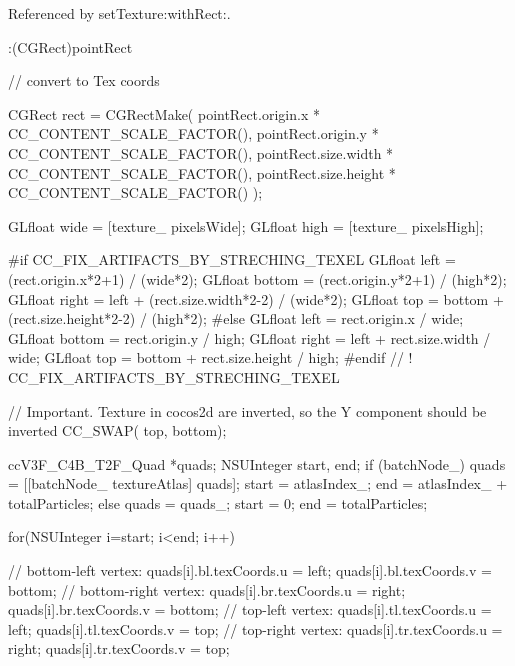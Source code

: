 Referenced by set\-Texture\-:with\-Rect\-:.


\begin{DoxyCode}
                             :(CGRect)pointRect
{
    // convert to Tex coords

        CGRect rect = CGRectMake(
                                                         pointRect.origin.x * 
      CC_CONTENT_SCALE_FACTOR(),
                                                         pointRect.origin.y * 
      CC_CONTENT_SCALE_FACTOR(),
                                                         pointRect.size.width *
       CC_CONTENT_SCALE_FACTOR(),
                                                         pointRect.size.height 
      * CC_CONTENT_SCALE_FACTOR() );

        GLfloat wide = [texture_ pixelsWide];
        GLfloat high = [texture_ pixelsHigh];

#if CC_FIX_ARTIFACTS_BY_STRECHING_TEXEL
        GLfloat left = (rect.origin.x*2+1) / (wide*2);
        GLfloat bottom = (rect.origin.y*2+1) / (high*2);
        GLfloat right = left + (rect.size.width*2-2) / (wide*2);
        GLfloat top = bottom + (rect.size.height*2-2) / (high*2);
#else
        GLfloat left = rect.origin.x / wide;
        GLfloat bottom = rect.origin.y / high;
        GLfloat right = left + rect.size.width / wide;
        GLfloat top = bottom + rect.size.height / high;
#endif // ! CC_FIX_ARTIFACTS_BY_STRECHING_TEXEL

        // Important. Texture in cocos2d are inverted, so the Y component
       should be inverted
        CC_SWAP( top, bottom);

        ccV3F_C4B_T2F_Quad *quads;
        NSUInteger start, end;
        if (batchNode_)
        {
                quads = [[batchNode_ textureAtlas] quads];
                start = atlasIndex_;
                end = atlasIndex_ + totalParticles;
        }
        else
        {
                quads = quads_;
                start = 0;
                end = totalParticles;
        }

        for(NSUInteger i=start; i<end; i++) {

                // bottom-left vertex:
                quads[i].bl.texCoords.u = left;
                quads[i].bl.texCoords.v = bottom;
                // bottom-right vertex:
                quads[i].br.texCoords.u = right;
                quads[i].br.texCoords.v = bottom;
                // top-left vertex:
                quads[i].tl.texCoords.u = left;
                quads[i].tl.texCoords.v = top;
                // top-right vertex:
                quads[i].tr.texCoords.u = right;
                quads[i].tr.texCoords.v = top;
        }
}
\end{DoxyCode}
